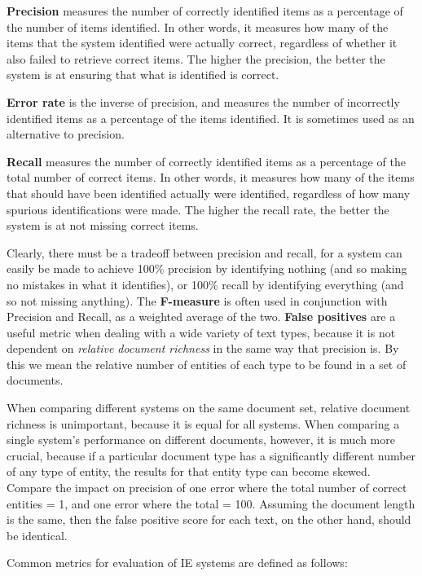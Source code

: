 \textbf{Precision} measures the number of correctly identified items
as a percentage of the number of items identified. In other words, it
measures how many of the items that the system identified were
actually correct, regardless of whether it also failed to retrieve
correct items. The higher the precision, the better the system is
at ensuring that what is identified is correct. 

\textbf{Error rate} is the inverse of precision, and measures the
number of incorrectly identified items as a percentage of the items
identified. It is sometimes used as an alternative to precision.

\textbf{Recall} measures the number of correctly identified items as a
percentage of the total number of correct items. In other words, it
measures how many of the items that should have been identified
actually were identified, regardless of how many spurious
identifications were made. The higher the recall rate, the better the
system is at not missing correct items.

Clearly, there must be a tradeoff between precision and recall, for a
system can easily be made to achieve 100\% precision by identifying
nothing (and so making no mistakes in what it identifies), or 100\%
recall by identifying everything (and so not missing anything). The
\textbf{F-measure} \cite{van79} is often used in conjunction with 
Precision and Recall, as a weighted average of the two. 
\textbf{False positives} are a
useful metric when dealing with a wide variety of text types, because
it is not dependent on \textit{relative document richness} in the same way that
precision is. By this we mean the relative number of entities of each type
to be found in a set of documents.

When comparing different systems on the same document set, relative
document richness is unimportant, because it is equal for all
systems. When comparing a single system's performance on different
documents, however, it is much more crucial, because if a particular
document type has a significantly different number of any type of
entity, the results for that entity type can become skewed.
Compare the impact on precision of
one error where the total number of correct entities = 1, and one
error where the total = 100. Assuming the document length is the
same, then the false positive score for each text, on the other hand, 
should be identical.

Common metrics for evaluation of IE systems are defined as follows:

